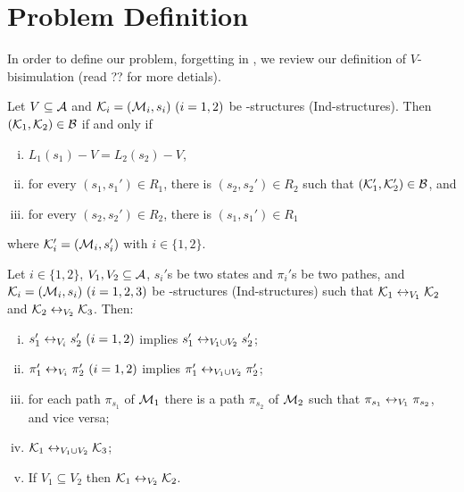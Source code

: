\documentclass[letterpaper]{article} %
\begin{document}
\section{Problem Definition}
In order to define our problem, \ie forgetting in \CTL, we review our definition of $V$-bisimulation (read ?? for more detials).
\begin{definition}\label{def:Vbi}
Let $V\subseteq\cal A$
and ${\cal K}_i=({\cal M}_i,s_i)~(i=1,2)$ be \MPK-structures (Ind-structures).
Then $({\cal K}_1,{\cal K}_2)\in\cal B$ if and only if
  \begin{enumerate}[(i)]
    \item $L_1(s_1)- V = L_2(s_2)-V$,
    \item for every $(s_1,s_1')\in R_1$, there is $(s_2,s_2')\in R_2$
    such that $({\cal K}_1',{\cal K}_2')\in {\cal B}$, and
    \item for every $(s_2,s_2')\in R_2$, there is $(s_1,s_1')\in R_1$
   \end{enumerate}
 where ${\cal K}_i'=({\cal M}_i,s_i')$ with $i\in\{1,2\}$.
\end{definition}

\begin{proposition}\label{div}
Let $i\in \{1,2\}$, $V_1,V_2\subseteq\cal A$, $s_i'$s be two states and
  $\pi_i'$s be two pathes,
and ${\cal K}_i=({\cal M}_i,s_i)~(i=1,2,3)$ be \MPK-structures (Ind-structures)
 such that
${\cal K}_1\leftrightarrow_{V_1}{\cal K}_2$ and ${\cal K}_2\leftrightarrow_{V_2}{\cal K}_3$.
 Then:
 \begin{enumerate}[(i)]
   \item $s_1'\leftrightarrow_{V_i}s_2'~(i=1,2)$ implies $s_1'\leftrightarrow_{V_1\cup V_2}s_2'$;
   \item $\pi_1'\leftrightarrow_{V_i}\pi_2'~(i=1,2)$ implies $\pi_1'\leftrightarrow_{V_1\cup V_2}\pi_2'$;
   \item for each path $\pi_{s_1}$ of ${\cal M}_1$ there is a path $\pi_{s_2}$  of ${\cal M}_2$ such that $\pi_{s_1} \leftrightarrow_{V_1} \pi_{s_2}$, and vice versa;
   \item ${\cal K}_1\leftrightarrow_{V_1\cup V_2}{\cal K}_3$;
   \item If $V_1 \subseteq V_2$ then ${\cal K}_1 \leftrightarrow_{V_2} {\cal K}_2$.
 \end{enumerate}
\end{proposition}
\end{document}
